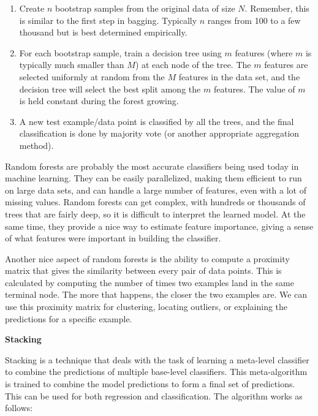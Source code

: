 \documentclass[]{krantz}
\begin{document}
\begin{enumerate}
\def\labelenumi{\arabic{enumi}.}
\item
  Create \(n\) bootstrap samples from the original data of size \(N\).
  Remember, this is similar to the first step in bagging. Typically
  \(n\) ranges from 100 to a few thousand but is best determined
  empirically.
\item
  For each bootstrap sample, train a decision tree using \(m\) features
  (where \(m\) is typically much smaller than \(M\)) at each node of the
  tree. The \(m\) features are selected uniformly at random from the
  \(M\) features in the data set, and the decision tree will select the
  best split among the \(m\) features. The value of \(m\) is held
  constant during the forest growing.
\item
  A new test example/data point is classified by all the trees, and the
  final classification is done by majority vote (or another appropriate
  aggregation method).
\end{enumerate}

Random forests are probably the most accurate classifiers being used
today in machine learning. They can be easily parallelized, making them
efficient to run on large data sets, and can handle a large number of
features, even with a lot of missing values. Random forests can get
complex, with hundreds or thousands of trees that are fairly deep, so it
is difficult to interpret the learned model. At the same time, they
provide a nice way to estimate feature importance, giving a sense of
what features were important in building the classifier.

Another nice aspect of random forests is the ability to compute a
proximity matrix that gives the similarity between every pair of data
points. This is calculated by computing the number of times two examples
land in the same terminal node. The more that happens, the closer the
two examples are. We can use this proximity matrix for clustering,
locating outliers, or explaining the predictions for a specific example.

\textbf{Stacking}

Stacking is a technique that deals with the task of learning a
meta-level classifier to combine the predictions of multiple base-level
classifiers. This meta-algorithm is trained to combine the model
predictions to form a final set of predictions. This can be used for
both regression and classification. The algorithm works as follows:
\end{document}
